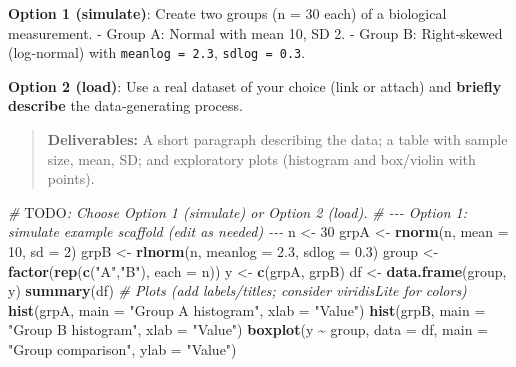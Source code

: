 \documentclass[
  11pt,
]{article}
\newenvironment{Shaded}{\begin{snugshade}}{\end{snugshade}}
\newcommand{\AlertTok}[1]{\textcolor[rgb]{0.94,0.16,0.16}{#1}}
\newcommand{\AttributeTok}[1]{\textcolor[rgb]{0.13,0.29,0.53}{#1}}
\newcommand{\CommentTok}[1]{\textcolor[rgb]{0.56,0.35,0.01}{\textit{#1}}}
\newcommand{\DecValTok}[1]{\textcolor[rgb]{0.00,0.00,0.81}{#1}}
\newcommand{\FloatTok}[1]{\textcolor[rgb]{0.00,0.00,0.81}{#1}}
\newcommand{\FunctionTok}[1]{\textcolor[rgb]{0.13,0.29,0.53}{\textbf{#1}}}
\newcommand{\NormalTok}[1]{#1}
\newcommand{\OtherTok}[1]{\textcolor[rgb]{0.56,0.35,0.01}{#1}}
\newcommand{\SpecialCharTok}[1]{\textcolor[rgb]{0.81,0.36,0.00}{\textbf{#1}}}
\newcommand{\StringTok}[1]{\textcolor[rgb]{0.31,0.60,0.02}{#1}}
\begin{document}
\textbf{Option 1 (simulate)}: Create two groups (n = 30 each) of a
biological measurement. - Group A: Normal with mean 10, SD 2. - Group B:
Right‑skewed (log‑normal) with \texttt{meanlog\ =\ 2.3},
\texttt{sdlog\ =\ 0.3}.

\textbf{Option 2 (load)}: Use a real dataset of your choice (link or
attach) and \textbf{briefly describe} the data‑generating process.

\begin{quote}
\textbf{Deliverables:} A short paragraph describing the data; a table
with sample size, mean, SD; and exploratory plots (histogram and
box/violin with points).
\end{quote}

\begin{Shaded}
\begin{Highlighting}[]
\CommentTok{\# }\AlertTok{TODO}\CommentTok{: Choose Option 1 (simulate) or Option 2 (load).}
\CommentTok{\# {-}{-}{-} Option 1: simulate example scaffold (edit as needed) {-}{-}{-}}
\NormalTok{n }\OtherTok{\textless{}{-}} \DecValTok{30}
\NormalTok{grpA }\OtherTok{\textless{}{-}} \FunctionTok{rnorm}\NormalTok{(n, }\AttributeTok{mean =} \DecValTok{10}\NormalTok{, }\AttributeTok{sd =} \DecValTok{2}\NormalTok{)}
\NormalTok{grpB }\OtherTok{\textless{}{-}} \FunctionTok{rlnorm}\NormalTok{(n, }\AttributeTok{meanlog =} \FloatTok{2.3}\NormalTok{, }\AttributeTok{sdlog =} \FloatTok{0.3}\NormalTok{)}
\NormalTok{group }\OtherTok{\textless{}{-}} \FunctionTok{factor}\NormalTok{(}\FunctionTok{rep}\NormalTok{(}\FunctionTok{c}\NormalTok{(}\StringTok{"A"}\NormalTok{,}\StringTok{"B"}\NormalTok{), }\AttributeTok{each =}\NormalTok{ n))}
\NormalTok{y }\OtherTok{\textless{}{-}} \FunctionTok{c}\NormalTok{(grpA, grpB)}
\NormalTok{df }\OtherTok{\textless{}{-}} \FunctionTok{data.frame}\NormalTok{(group, y)}
\FunctionTok{summary}\NormalTok{(df)}
\CommentTok{\# Plots (add labels/titles; consider viridisLite for colors)}
\FunctionTok{hist}\NormalTok{(grpA, }\AttributeTok{main =} \StringTok{"Group A histogram"}\NormalTok{, }\AttributeTok{xlab =} \StringTok{"Value"}\NormalTok{)}
\FunctionTok{hist}\NormalTok{(grpB, }\AttributeTok{main =} \StringTok{"Group B histogram"}\NormalTok{, }\AttributeTok{xlab =} \StringTok{"Value"}\NormalTok{)}
\FunctionTok{boxplot}\NormalTok{(y }\SpecialCharTok{\textasciitilde{}}\NormalTok{ group, }\AttributeTok{data =}\NormalTok{ df, }\AttributeTok{main =} \StringTok{"Group comparison"}\NormalTok{, }\AttributeTok{ylab =} \StringTok{"Value"}\NormalTok{)}
\end{Highlighting}
\end{Shaded}
\end{document}
